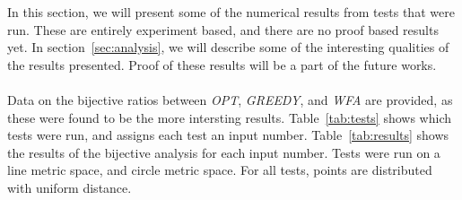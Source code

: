 In this section, we will present some of the numerical results from tests that were run. These are entirely experiment based, and there are no proof based results yet. In section~\ref{sec:analysis}, we will describe some of the interesting qualities of the results presented. Proof of these results will be a part of the future works. 
\\ \\
Data on the bijective ratios between \textit{OPT}, \textit{GREEDY}, and \textit{WFA} are provided, as these were found to be the more intersting results. Table~\ref{tab:tests} shows which tests were run, and assigns each test an input number. Table~\ref{tab:results} shows the results of the bijective analysis for each input number. Tests were run on a line metric space, and circle metric space. For all tests, points are distributed with uniform distance.

